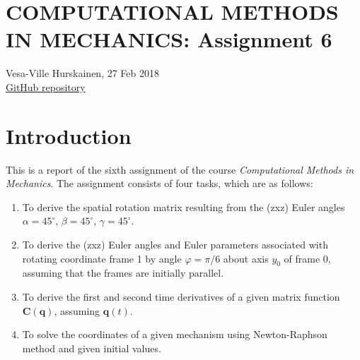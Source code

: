 \documentclass{article}
\begin{document}
\section*{COMPUTATIONAL METHODS IN MECHANICS: Assignment 6}
Vesa-Ville Hurskainen, 27 Feb 2018\\
\href{https://github.com/VesaVilleHurskainen/cmim2018}{GitHub repository}

\section*{Introduction}
This is a report of the sixth assignment of the course \textit{Computational Methods in Mechanics}. The assignment consists of four tasks, which are as follows:
\begin{enumerate}
	\setlength\itemsep{0pt}
	\item To derive the spatial rotation matrix resulting from the (zxz) Euler angles $\alpha = 45^\circ$, $\beta = 45^\circ$, $\gamma = 45^\circ$.
	\item To derive the (zxz) Euler angles and Euler parameters associated with rotating coordinate frame 1 by angle $\varphi = \pi/6$ about axis $y_0$ of frame 0, assuming that the frames are initially parallel.
	\item To derive the first and second time derivatives of a given matrix function $\mathbf{C}(\bm{q})$, assuming $\bm{q}(t)$.
	\item To solve the coordinates of a given mechanism using Newton-Raphson method and given initial values.
\end{enumerate}
\end{document}
